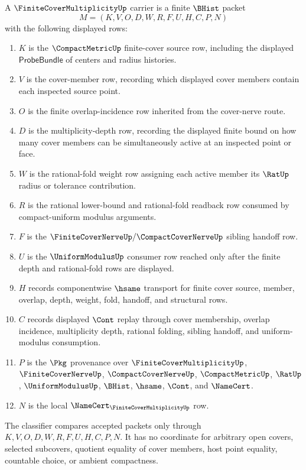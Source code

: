 \begin{definition}
\label{def:finite-cover-multiplicity-carrier}
A $\FiniteCoverMultiplicityUp$ carrier is a finite $\BHist$ packet
$$
M=(K,V,O,D,W,R,F,U,H,C,P,N)
$$
with the following displayed rows:
\begin{enumerate}
\item $K$ is the $\CompactMetricUp$ finite-cover source row, including the displayed $\mathsf{ProbeBundle}$ of centers and radius histories.
\item $V$ is the cover-member row, recording which displayed cover members contain each inspected source point.
\item $O$ is the finite overlap-incidence row inherited from the cover-nerve route.
\item $D$ is the multiplicity-depth row, recording the displayed finite bound on how many cover members can be simultaneously active at an inspected point or face.
\item $W$ is the rational-fold weight row assigning each active member its $\RatUp$ radius or tolerance contribution.
\item $R$ is the rational lower-bound and rational-fold readback row consumed by compact-uniform modulus arguments.
\item $F$ is the $\FiniteCoverNerveUp/\CompactCoverNerveUp$ sibling handoff row.
\item $U$ is the $\UniformModulusUp$ consumer row reached only after the finite depth and rational-fold rows are displayed.
\item $H$ records componentwise $\hsame$ transport for finite cover source, member, overlap, depth, weight, fold, handoff, and structural rows.
\item $C$ records displayed $\Cont$ replay through cover membership, overlap incidence, multiplicity depth, rational folding, sibling handoff, and uniform-modulus consumption.
\item $P$ is the $\Pkg$ provenance over $\FiniteCoverMultiplicityUp$, $\FiniteCoverNerveUp$, $\CompactCoverNerveUp$, $\CompactMetricUp$, $\RatUp$, $\UniformModulusUp$, $\BHist$, $\hsame$, $\Cont$, and $\NameCert$.
\item $N$ is the local $\NameCert_{\FiniteCoverMultiplicityUp}$ row.
\end{enumerate}
The classifier compares accepted packets only through $K,V,O,D,W,R,F,U,H,C,P,N$. It has no coordinate for arbitrary open covers, selected subcovers, quotient equality of cover members, host point equality, countable choice, or ambient compactness.
\end{definition}


